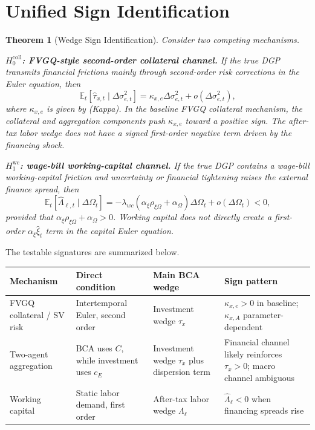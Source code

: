 \documentclass[11pt]{article}
\newcommand{\E}{\mathbb{E}}
\theoremstyle{plain}
\newtheorem{theorem}{Theorem}
\theoremstyle{definition}
\begin{document}
\section{Unified Sign Identification}

\begin{theorem}[Wedge Sign Identification]
Consider two competing mechanisms.

\medskip
\noindent
\textbf{$H_0^{\mathrm{coll}}$: FVGQ-style second-order collateral channel.}
If the true DGP transmits financial frictions mainly through second-order risk
corrections in the Euler equation, then
\[
\E_t[\hat\tau_{x,t}\mid \Delta\sigma_{e,t}^2]
=
\kappa_{x,e}\Delta\sigma_{e,t}^2
+o(\Delta\sigma_{e,t}^2),
\]
where $\kappa_{x,e}$ is given by (Kappa). In the baseline FVGQ collateral
mechanism, the collateral and aggregation components push
$\kappa_{x,e}$ toward a positive sign. The after-tax labor wedge does not have
a signed first-order negative term driven by the financing shock.

\medskip
\noindent
\textbf{$H_1^{\mathrm{wc}}$: wage-bill working-capital channel.}
If the true DGP contains a wage-bill working-capital friction and uncertainty
or financial tightening raises the external finance spread, then
\[
\E_t[\hat\Lambda_{\ell,t}\mid \Delta\Omega_t]
=
-\lambda_{wc}(\alpha_\xi\rho_{\xi\Omega}+\alpha_\Omega)\Delta\Omega_t
+o(\Delta\Omega_t)
<0,
\]
provided that $\alpha_\xi\rho_{\xi\Omega}+\alpha_\Omega>0$. Working capital
does not directly create a first-order $\alpha_\xi\hat\xi_t$ term in the
capital Euler equation.
\end{theorem}

The testable signatures are summarized below.

\begin{center}
\begin{tabular}{p{}p{}p{}p{}}
\toprule
Mechanism & Direct condition & Main BCA wedge & Sign pattern \\
\midrule
FVGQ collateral / SV risk & Intertemporal Euler, second order & Investment wedge $\tau_x$ &
$\kappa_{x,e}>0$ in baseline; $\kappa_{x,A}$ parameter-dependent \\
\addlinespace
Two-agent aggregation & BCA uses $C$, while investment uses $c_E$ & Investment wedge $\tau_x$ plus dispersion term &
Financial channel likely reinforces $\tau_x>0$; macro channel ambiguous \\
\addlinespace
Working capital & Static labor demand, first order & After-tax labor wedge $\Lambda_\ell$ &
$\hat\Lambda_{\ell}<0$ when financing spreads rise \\
\bottomrule
\end{tabular}
\end{center}
\end{document}
